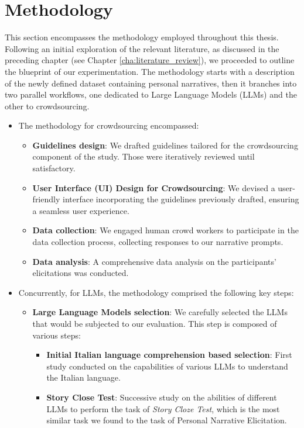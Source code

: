 \chapter{Methodology}
\label{cha:methodology}
This section encompasses the methodology employed throughout this thesis. Following an initial exploration of the relevant literature, as discussed in the preceding chapter (see Chapter \ref{cha:literature_review}), we proceeded to outline the blueprint of our experimentation. The methodology starts with a description of the newly defined dataset containing personal narratives, then it branches into two parallel workflows, one dedicated to Large Language Models (LLMs) and the other to crowdsourcing. 
\begin{itemize}
    \item The methodology for crowdsourcing encompassed:
        \begin{itemize}
            \item \textbf{Guidelines design}: We drafted guidelines tailored for the crowdsourcing component of the study. Those were iteratively reviewed until satisfactory.
            \item \textbf{User Interface (UI) Design for Crowdsourcing}: We devised a user-friendly interface incorporating the guidelines previously drafted, ensuring a seamless user experience.
            \item \textbf{Data collection}: We engaged human crowd workers to participate in the data collection process, collecting responses to our narrative prompts.
            \item \textbf{Data analysis}: A comprehensive data analysis on the participants' elicitations was conducted.
        \end{itemize}
    \item Concurrently, for LLMs, the methodology comprised the following key steps:
        \begin{itemize}
            \item \textbf{Large Language Models selection}: We carefully selected the LLMs that would be subjected to our evaluation. This step is composed of various steps:
            \begin{itemize}
                \item \textbf{Initial Italian language comprehension based selection}: First study conducted on the capabilities of various LLMs to understand the Italian language.
                \item \textbf{Story Close Test}: Successive study on the abilities of different LLMs to perform the task of \emph{Story Cloze Test}, which is the most similar task we found to the task of Personal Narrative Elicitation.

\end{itemize}
\end{itemize}
\end{itemize}
